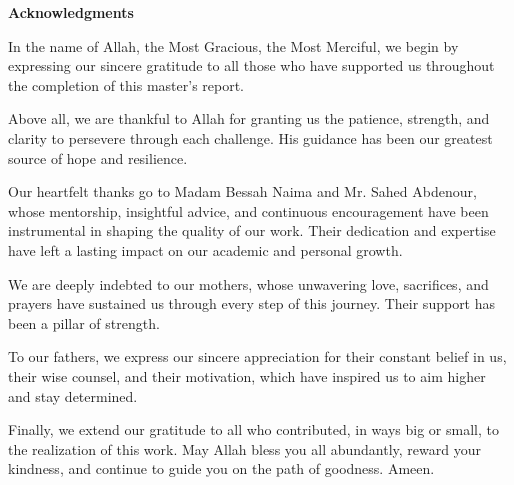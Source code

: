 \pagestyle{plain}
\setcounter{page}{1}

\noindent
{\Large\bfseries Acknowledgments}

\noindent
In the name of Allah, the Most Gracious, the Most Merciful, we begin by expressing our sincere gratitude to all those who have supported us throughout the completion of this master’s report.

Above all, we are thankful to Allah for granting us the patience, strength, and clarity to persevere through each challenge. His guidance has been our greatest source of hope and resilience.

Our heartfelt thanks go to Madam Bessah Naima and Mr. Sahed Abdenour, whose mentorship, insightful advice, and continuous encouragement have been instrumental in shaping the quality of our work. Their dedication and expertise have left a lasting impact on our academic and personal growth.

We are deeply indebted to our mothers, whose unwavering love, sacrifices, and prayers have sustained us through every step of this journey. Their support has been a pillar of strength.

To our fathers, we express our sincere appreciation for their constant belief in us, their wise counsel, and their motivation, which have inspired us to aim higher and stay determined.

Finally, we extend our gratitude to all who contributed, in ways big or small, to the realization of this work. May Allah bless you all abundantly, reward your kindness, and continue to guide you on the path of goodness.  
Ameen.
